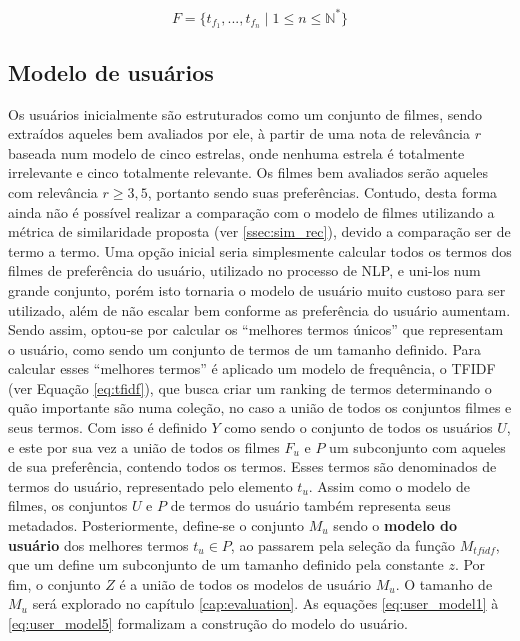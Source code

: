 \begin{equation}
	F = \{t_{f_1}, ..., t_{f_n} \; | \; 1 \leq n \leq \mathbb{N}^*\}
\label{eq:film_model2}
\end{equation}

\subsection{Modelo de usuários}
\label{ssec:user_model}

Os usuários inicialmente são estruturados como um conjunto de filmes, sendo extraídos aqueles bem avaliados por ele, à partir de uma nota de relevância $r$ baseada num modelo de cinco estrelas, onde nenhuma estrela é totalmente irrelevante e cinco totalmente relevante. Os filmes bem avaliados serão aqueles com relevância $r \geq 3,5$, portanto sendo suas preferências. Contudo, desta forma ainda não é possível realizar a comparação com o modelo de filmes utilizando a métrica de similaridade proposta (ver \ref{ssec:sim_rec}), devido a comparação ser de termo a termo. Uma opção inicial seria simplesmente calcular todos os termos dos filmes de preferência do usuário, utilizado no processo de \ac{NLP}, e uni-los num grande conjunto, porém isto tornaria o modelo de usuário muito custoso para ser utilizado, além de não escalar bem conforme as preferência do usuário aumentam. Sendo assim, optou-se por calcular os \enquote{melhores termos únicos} que representam o usuário, como sendo um conjunto de termos de um tamanho definido. Para calcular esses \enquote{melhores termos} é aplicado um modelo de frequência, o \ac{TFIDF} (ver Equação \ref{eq:tfidf}), que busca criar um ranking de termos determinando o quão importante são numa coleção, no caso a união de todos os conjuntos filmes e seus termos. Com isso é definido $Y$ como sendo o conjunto de todos os usuários $U$, e este por sua vez a união de todos os filmes $F_u$ e $P$ um subconjunto com aqueles de sua preferência, contendo todos os termos. Esses termos são denominados de termos do usuário, representado pelo elemento $t_u$. Assim como o modelo de filmes, os conjuntos $U$ e $P$ de termos do usuário também representa seus metadados. Posteriormente, define-se o conjunto $M_u$ sendo o \textbf{modelo do usuário} dos melhores termos $t_u \in P$, ao passarem pela seleção da função $M_{tfidf}$, que um define um subconjunto de um tamanho definido pela constante $z$. Por fim, o conjunto $Z$ é a união de todos os modelos de usuário $M_u$. O tamanho de $M_u$ será explorado no capítulo \ref{cap:evaluation}. As equações \ref{eq:user_model1} à \ref{eq:user_model5} formalizam a construção do modelo do usuário.


